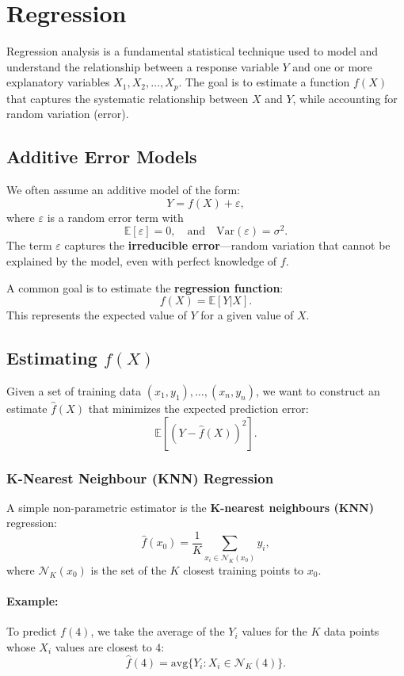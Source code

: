 \section{Regression}

Regression analysis is a fundamental statistical technique used to model and understand the relationship between a response variable \( Y \) and one or more explanatory variables \( X_1, X_2, \ldots, X_p \). The goal is to estimate a function \( f(X) \) that captures the systematic relationship between \( X \) and \( Y \), while accounting for random variation (error).

\subsection{Additive Error Models}

We often assume an additive model of the form:
\[
Y = f(X) + \varepsilon,
\]
where \( \varepsilon \) is a random error term with
\[
\mathbb{E}[\varepsilon] = 0, \quad \text{and} \quad \text{Var}(\varepsilon) = \sigma^2.
\]
The term \( \varepsilon \) captures the \textbf{irreducible error}—random variation that cannot be explained by the model, even with perfect knowledge of \( f \).

A common goal is to estimate the \textbf{regression function}:
\[
f(X) = \mathbb{E}[Y|X].
\]
This represents the expected value of \( Y \) for a given value of \( X \).

\subsection{Estimating \( f(X) \)}

Given a set of training data \((x_1, y_1), \ldots, (x_n, y_n)\), we want to construct an estimate \(\hat{f}(X)\) that minimizes the expected prediction error:
\[
\mathbb{E}\left[(Y - \hat{f}(X))^2\right].
\]

\subsubsection{K-Nearest Neighbour (KNN) Regression}

A simple non-parametric estimator is the \textbf{K-nearest neighbours (KNN)} regression:
\[
\hat{f}(x_0) = \frac{1}{K} \sum_{x_i \in \mathcal{N}_K(x_0)} y_i,
\]
where \(\mathcal{N}_K(x_0)\) is the set of the \(K\) closest training points to \(x_0\).

\paragraph{Example:}
To predict \( f(4) \), we take the average of the \(Y_i\) values for the \(K\) data points whose \(X_i\) values are closest to \(4\):
\[
\hat{f}(4) = \text{avg}\{Y_i : X_i \in \mathcal{N}_K(4)\}.
\]

